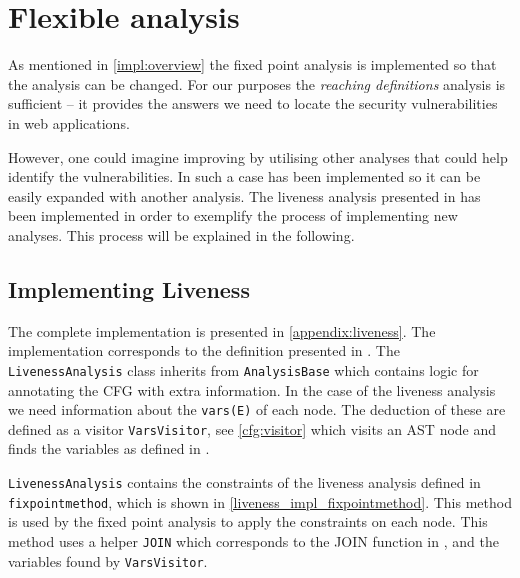 \section{Flexible analysis}\label{impl:flexible}
As mentioned in \cref{impl:overview} the fixed point analysis is implemented so that the analysis can be changed.
For our purposes the \emph{reaching definitions} analysis is sufficient -- it provides the answers we need to locate the security vulnerabilities in web applications.

However, one could imagine improving \pyt{} by utilising other analyses that could help identify the vulnerabilities.
In such a case \pyt{} has been implemented so it can be easily expanded with another analysis.
The liveness analysis presented in \citet[p.~19]{schwartzbach} has been implemented in order to exemplify the process of implementing new analyses.
This process will be explained in the following.

\subsection{Implementing Liveness}
The complete implementation is presented in \cref{appendix:liveness}.
The implementation corresponds to the definition presented in \citet[p.~20]{schwartzbach}.
The \texttt{LivenessAnalysis} class inherits from \texttt{AnalysisBase} which contains logic for annotating the CFG with extra information.
In the case of the liveness analysis we need information about the \texttt{vars(E)} of each node.
The deduction of these are defined as a visitor \texttt{VarsVisitor}, see \cref{cfg:visitor} which visits an AST node and finds the variables as defined in \citet{schwartzbach}.

\texttt{LivenessAnalysis} contains the constraints of the liveness analysis defined in \texttt{fixpointmethod}, which is shown in \cref{liveness_impl_fixpointmethod}.
This method is used by the fixed point analysis to apply the constraints on each node.
This method uses a helper \texttt{JOIN} which corresponds to the JOIN function in \citet{schwartzbach}, and the variables found by \texttt{VarsVisitor}.

